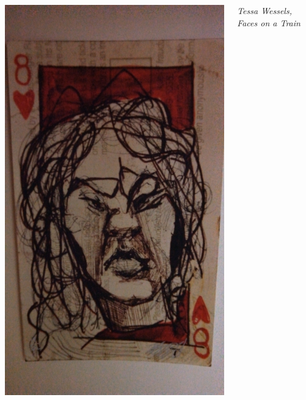 \documentclass{beamer}
\begin{document}
\begin{frame}
\begin{columns}[c]
\hfill\includegraphics[height=0.8\textheight]{eight.jpg}\hfill\mbox{}

{\small\emph{Tessa Wessels, {\em Faces on a Train}}}

\end{columns}
\end{frame}


\end{document}
